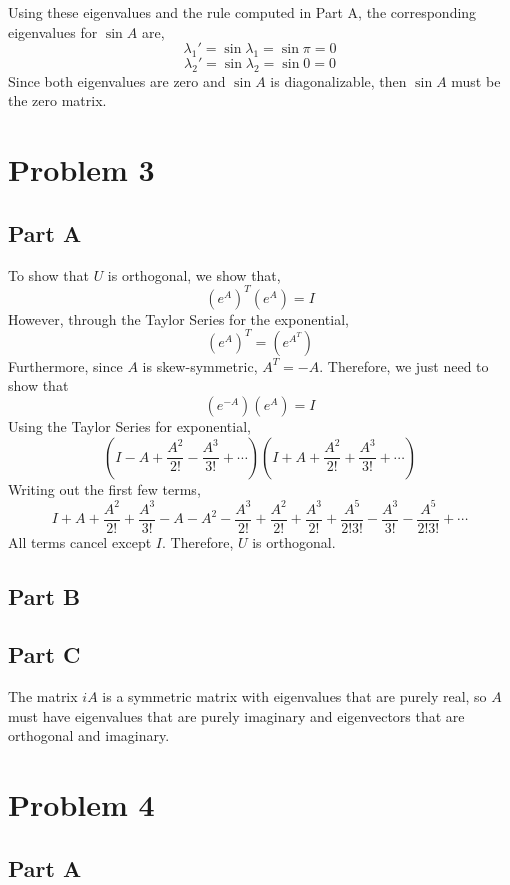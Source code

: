 \documentclass{article}
\begin{document}
Using these eigenvalues and the rule computed in Part A, the corresponding
eigenvalues for $\sin A$ are,
$$ \lambda_1' = \sin \lambda_1 = \sin \pi = 0 $$
$$ \lambda_2' = \sin \lambda_2 = \sin 0 = 0 $$
Since both eigenvalues are zero and $\sin A$ is diagonalizable, then $\sin A$
must be the zero matrix.

\section*{Problem 3}

\subsection*{Part A}

To show that $U$ is orthogonal, we show that,
$$ \left(e^{A}\right)^T \left(e^A\right) = I $$
However, through the Taylor Series for the exponential,
$$ \left(e^A\right)^T = \left(e^{A^T}\right) $$
Furthermore, since $A$ is skew-symmetric, $A^T = -A$. Therefore, we just need
to show that
$$ \left(e^{-A}\right) \left(e^{A}\right) = I $$
Using the Taylor Series for exponential,
$$ \left(I - A + \frac{A^2}{2!} - \frac{A^3}{3!} + \cdots\right) \left(I + A
+ \frac{A^2}{2!} + \frac{A^3}{3!} + \cdots\right) $$
Writing out the first few terms,
$$ I + A + \frac{A^2}{2!} + \frac{A^3}{3!} - A - A^2 - \frac{A^3}{2!} +
\frac{A^2}{2!} + \frac{A^3}{2!} + \frac{A^5}{2!3!} - \frac{A^3}{3!} -
\frac{A^5}{2!3!} + \cdots $$
All terms cancel except $I$. Therefore, $U$ is orthogonal.

\subsection*{Part B}

\subsection*{Part C}

The matrix $iA$ is a symmetric matrix with eigenvalues that are purely real,
so $A$ must have eigenvalues that are purely imaginary and eigenvectors that
are orthogonal and imaginary.

\section*{Problem 4}

\subsection*{Part A}
\end{document}
